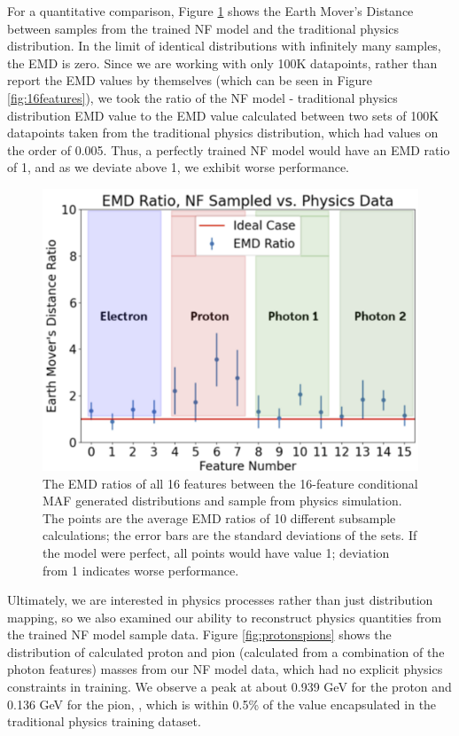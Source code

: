         For a quantitative comparison, Figure \ref{fig:EMD} shows the Earth Mover's Distance between samples from the trained NF model and the traditional physics distribution. In the limit of identical distributions with infinitely many samples, the EMD is zero. Since we are working with only 100K datapoints, rather than report the EMD values by themselves (which can be seen in Figure \ref{fig:16features}), we took the ratio of the NF model - traditional physics distribution EMD value to the EMD value calculated between two sets of 100K datapoints taken from the traditional physics distribution, which had values on the order of 0.005. Thus, a perfectly trained NF model would have an EMD ratio of 1, and as we deviate above 1, we exhibit worse performance.  
        

        \begin{figure}[H]
            \centering
            \includegraphics[width=.8\textwidth,trim={0 0 0 0 },clip]{Chapters/Ch3-Simulations/normalizing_flows/pics/FinalPictures/EMD/EMD_updated.png}
            \caption[Earth Mover's Distance Ratio]{The EMD ratios of all 16 features between the 16-feature conditional MAF generated distributions and sample from physics simulation. The points are the average EMD ratios of 10 different subsample calculations; the error bars are the standard deviations of the sets. If the model were perfect, all points would have value 1; deviation from 1 indicates worse performance.}
            \label{fig:EMD}
        \end{figure}
        
    
        Ultimately, we are interested in physics processes rather than just distribution mapping, so we also examined our ability to reconstruct physics quantities from the trained NF model sample data. Figure \ref{fig:protonspions} shows the distribution of calculated proton and pion (calculated from a combination of the photon features) masses from our NF model data, which had no explicit physics constraints in training. We observe a peak at about 0.939 GeV for the proton and 0.136 GeV for the pion, , which is within 0.5\% of the value encapsulated in the traditional physics training dataset. 
        
